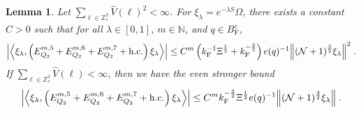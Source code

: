 \documentclass[12pt,a4paper]{article}
\numberwithin{equation}{section}
\newcommand{\NNN}{\mathbb{N}}
\newcommand{\1}{\mathbb{I}}
\newcommand{\F}{\mathrm{F}}
\newcommand{\Z}{\mathbb{Z}}
\newcommand{\NN}{\mathcal{N}}
\newcommand{\half}{\frac{1}{2}}
\newcommand{\eva}[1]{\left\langle #1 \right\rangle}
\theoremstyle{plain}
\newtheorem{lemma}[theorem]{Lemma}
\theoremstyle{definition}
\theoremstyle{remark}
\theoremstyle{plain}
\theoremstyle{definition}
\theoremstyle{remark}
\begin{document}
\begin{lemma} \label{lem:EQ213}
Let $ \sum_{\ell \in \Z^3_*} \hat{V}(\ell)^2 < \infty $. For $\xi_\lambda = e^{-\lambda S} \Omega$, there exists a constant $ C > 0 $ such that for all $ \lambda \in [0,1] $, $ m \in \NNN $, and $ q \in B_{\F}^c $,
\begin{equation}
\begin{aligned}
	\abs{\eva{\xi_\lambda,\left(E^{m,5}_{Q_2}+E^{m,6}_{Q_2}+E^{m,7}_{Q_2}+\mathrm{h.c.}\right) \xi_\lambda }}
	\leq C^m \left( k_{\F}^{-1} \Xi^{\half}
		+ k_{\F}^{-\frac 32} \right)
		e(q)^{-1}
		\norm { (\NN+1)^{\frac 32} \xi_\lambda }^2 \;. \label{eq:estEQ213_Coulomb}
\end{aligned}
\end{equation}
If $ \sum_{\ell \in \Z^3_*} \hat{V}(\ell) < \infty $, then we have the even stronger bound
\begin{equation}
\begin{aligned}
	\abs{\eva{\xi_\lambda,\left(E^{m,5}_{Q_2}+E^{m,6}_{Q_2}+E^{m,7}_{Q_2}+\mathrm{h.c.}\right) \xi_\lambda }}
	\leq C^m k_{\F}^{-\frac 32} \Xi^{\half} e(q)^{-1}
		\norm { (\NN+1)^{\frac 32} \xi_\lambda } \;. \label{eq:estEQ213}
\end{aligned}
\end{equation}
\end{lemma}
\end{document}
